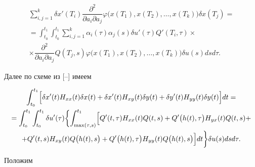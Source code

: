 \begin{multline}

\label{mans:eq30}

 \sum_{i,j=1}^{k} \delta x'(T_{i})  \dfrac{\partial^{2}  } {\partial a_{i} \partial a_{j}} 

\varphi\bigl(x(T_{1}), x(T_{2}), \ldots, x(T_{k})\bigr) 

 \delta x(T_{j}) =  \\

 = \int_{t_{0}}^{t_{1}} \int_{t_{0}}^{t_{1}}   \sum_{i,j=1}^{k} \alpha_{i} (\tau) \alpha_{j} (s)  \delta u'(\tau) Q'(T_{i}, \tau) \times

 \\

 \times

  \dfrac{\partial^{2} } {\partial a_{i} \partial a_{j}} Q(T_{j}, s)

\varphi \bigl(x(T_{1}), x(T_{2}), \ldots, x(T_{k})\bigr)  

   \delta u(s) ds d\tau .  

\end{multline}



Далее по схеме из [--] имеем

\begin{multline}

\label{mans:eq30}

\int_{t_{0}}^{t_{1}} 

\Bigl[ \delta x'(t) H_{xx}(t) \delta x(t) +\delta x'(t) H_{xy}(t) \delta y(t) + \delta y'(t) H_{yy}(t) \delta y(t) \Bigr] dt=   \\

= \int_{t_{0}}^{t_{1}} \int_{t_{0}}^{t_{1}} \delta u'(\tau) 

\biggl\lbrace \int_{\max (\tau, s)}^{t_{1}} 

\Bigl[ 

Q'(t, \tau) H_{xx}(t) Q(t, s)+Q'\bigl(h(t), \tau\bigr) H_{yx}(t) Q(t, s)+   \\

 + Q'(t, s) H_{xy}(t) Q\bigl(h(t),  s\bigr) + Q'\bigl(h(t), \tau\bigr) H_{yy}(t) Q\bigl(h(t), s\bigr) \Bigr] dt \biggr\rbrace  \delta u(s) ds d\tau . 

\end{multline}



Положим

